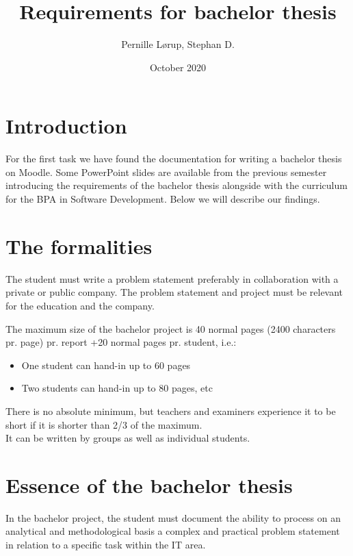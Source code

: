 \documentclass[12pt]{article}
\title{Requirements for bachelor thesis}
\author{Pernille Lørup, Stephan D.}
\date{October 2020}
\begin{document}
\clearpage\maketitle
\thispagestyle{empty}

\pagebreak
\tableofcontents

\pagebreak
\section{Introduction}

For the first task we have found the documentation for writing a bachelor thesis on Moodle. Some PowerPoint slides are available from the previous semester introducing the requirements of the bachelor thesis\cite{bachelor} alongside with the curriculum for the BPA in Software Development.\cite{studieordning} Below we will describe our findings.

\section{The formalities}
The student must write a problem statement preferably in collaboration with a private or public company. The problem statement and project must be relevant for the education and the company. 

The maximum size of the bachelor project is 40 normal pages 
(2400 characters pr. page) pr. report +20 normal pages pr. student, i.e.:

\begin{itemize}
\item One student can hand-in up to 60 pages
\item Two students can hand-in up to 80 pages, etc
\end{itemize}

\noindent There is no absolute minimum, but teachers and
examiners experience it to be short if it is shorter
than 2/3 of the maximum.
\\
It can be written by groups as well as individual
students. 

\section{Essence of the bachelor thesis}
In the bachelor project, the student must document the ability to process on an analytical and methodological basis a complex and practical problem statement in relation to a specific task within the IT area. 

\pagebreak
\end{document}
